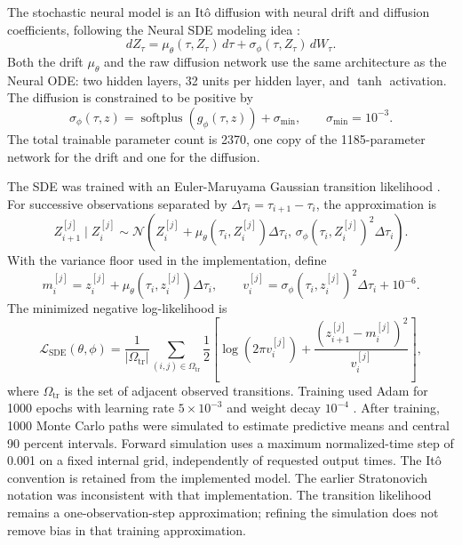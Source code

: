 
The stochastic neural model is an It\^o diffusion with neural drift and
diffusion coefficients, following the Neural SDE modeling idea
\citep{tzen2019neuralsde,kidger2021neuralsdegan}:
$$
  dZ_\tau
  =
  \mu_\theta(\tau,Z_\tau)\,d\tau
  +
  \sigma_\phi(\tau,Z_\tau)\,dW_\tau.
$$
Both the drift $\mu_\theta$ and the raw diffusion network use the same
architecture as the Neural ODE: two hidden layers, 32 units per hidden layer,
and $\tanh$ activation. The diffusion is constrained to be positive by
$$
  \sigma_\phi(\tau,z)
  =
  \operatorname{softplus}(g_\phi(\tau,z))+\sigma_{\min},
  \qquad
  \sigma_{\min}=10^{-3}.
$$
The total trainable parameter count is 2370, one copy of the 1185-parameter
network for the drift and one for the diffusion.

The SDE was trained with an Euler-Maruyama Gaussian transition likelihood
\citep{kloeden1992numerical}. For successive observations separated by
$\Delta\tau_i=\tau_{i+1}-\tau_i$, the approximation is
$$
  Z_{i+1}^{[j]}\mid Z_i^{[j]}
  \sim
  \mathcal N\left(
    Z_i^{[j]}+\mu_\theta(\tau_i,Z_i^{[j]})\Delta\tau_i,\,
    \sigma_\phi(\tau_i,Z_i^{[j]})^2\Delta\tau_i
  \right).
$$
With the variance floor used in the implementation, define
$$
  m_i^{[j]}=z_i^{[j]}+\mu_\theta(\tau_i,z_i^{[j]})\Delta\tau_i,
  \qquad
  v_i^{[j]}=\sigma_\phi(\tau_i,z_i^{[j]})^2\Delta\tau_i+10^{-6}.
$$
The minimized negative log-likelihood is
$$
  \mathcal L_{\mathrm{SDE}}(\theta,\phi)
  =
  \frac{1}{|\Omega_{\mathrm{tr}}|}
  \sum_{(i,j)\in\Omega_{\mathrm{tr}}}
  \frac{1}{2}
  \left[
    \log(2\pi v_i^{[j]})
    +
    \frac{(z_{i+1}^{[j]}-m_i^{[j]})^2}{v_i^{[j]}}
  \right],
$$
where $\Omega_{\mathrm{tr}}$ is the set of adjacent observed transitions.
Training used Adam for 1000 epochs with learning rate $5\times10^{-3}$ and
weight decay $10^{-4}$ \citep{kingma2015adam}. After training, 1000 Monte Carlo
paths were simulated to estimate predictive means and central 90 percent
intervals. Forward simulation uses a maximum normalized-time step of 0.001
on a fixed internal grid, independently of requested output times.
The It\^o convention is retained from the implemented model. The earlier
Stratonovich notation was inconsistent with that implementation. The
transition likelihood remains a one-observation-step approximation; refining
the simulation does not remove bias in that training approximation.
